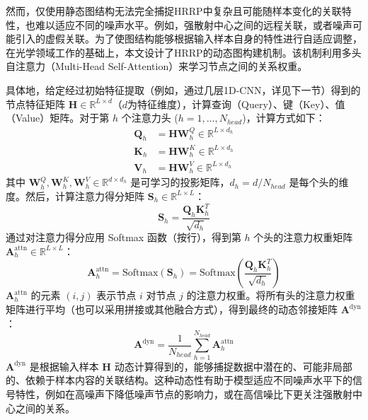 然而，仅使用静态图结构无法完全捕捉HRRP中复杂且可能随样本变化的关联特性，也难以适应不同的噪声水平。例如，强散射中心之间的远程关联，或者噪声可能引入的虚假关联。为了使图结构能够根据输入样本自身的特性进行自适应调整，在光学领域工作的基础上，本文设计了HRRP的动态图构建机制。该机制利用多头自注意力（Multi-Head Self-Attention）来学习节点之间的关系权重。

具体地，给定经过初始特征提取（例如，通过几层1D-CNN，详见下一节）得到的节点特征矩阵 $\mathbf{H} \in \mathbb{R}^{L \times d}$（$d$为特征维度），计算查询（Query）、键（Key）、值（Value）矩阵。对于第 $h$ 个注意力头 ($h=1, \dots, N_{head}$)，计算方式如下：
\begin{align}
    \mathbf{Q}_h &= \mathbf{H} \mathbf{W}_h^Q \in \mathbb{R}^{L \times d_h} \\
    \mathbf{K}_h &= \mathbf{H} \mathbf{W}_h^K \in \mathbb{R}^{L \times d_h} \\
    \mathbf{V}_h &= \mathbf{H} \mathbf{W}_h^V \in \mathbb{R}^{L \times d_h}
\end{align}
其中 $\mathbf{W}_h^Q, \mathbf{W}_h^K, \mathbf{W}_h^V \in \mathbb{R}^{d \times d_h}$ 是可学习的投影矩阵，$d_h = d / N_{head}$ 是每个头的维度。然后，计算注意力得分矩阵 $\mathbf{S}_h \in \mathbb{R}^{L \times L}$：
\begin{equation}
    \mathbf{S}_h = \frac{\mathbf{Q}_h \mathbf{K}_h^T}{\sqrt{d_h}}
    \label{eq:attention_scores}
\end{equation}
通过对注意力得分应用 Softmax 函数（按行），得到第 $h$ 个头的注意力权重矩阵 $\mathbf{A}_h^{\text{attn}} \in \mathbb{R}^{L \times L}$：
\begin{equation}
    \mathbf{A}_h^{\text{attn}} = \text{Softmax}(\mathbf{S}_h) = \text{Softmax}\left(\frac{\mathbf{Q}_h \mathbf{K}_h^T}{\sqrt{d_h}}\right)
    \label{eq:dynamic_adjacency_head}
\end{equation}
$\mathbf{A}_h^{\text{attn}}$ 的元素 $(i,j)$ 表示节点 $i$ 对节点 $j$ 的注意力权重。将所有头的注意力权重矩阵进行平均（也可以采用拼接或其他融合方式），得到最终的动态邻接矩阵 $\mathbf{A}^{\text{dyn}}$：
\begin{equation}
    \mathbf{A}^{\text{dyn}} = \frac{1}{N_{head}} \sum_{h=1}^{N_{head}} \mathbf{A}_h^{\text{attn}}
    \label{eq:dynamic_adjacency_final}
\end{equation}
$\mathbf{A}^{\text{dyn}}$ 是根据输入样本 $\mathbf{H}$ 动态计算得到的，能够捕捉数据中潜在的、可能非局部的、依赖于样本内容的关联结构。这种动态性有助于模型适应不同噪声水平下的信号特性，例如在高噪声下降低噪声节点的影响力，或在高信噪比下更关注强散射中心之间的关系。

